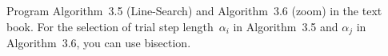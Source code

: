 \begin{problem}
  Program Algorithm~3.5 (Line-Search) and Algorithm~3.6 (zoom) in the text book.  For the selection of trial step length~$\alpha_i$ in Algorithm~3.5 and $\alpha_j$ in Algorithm~3.6, you can use bisection.
  \label{prob:ProgAlg}
\end{problem}
